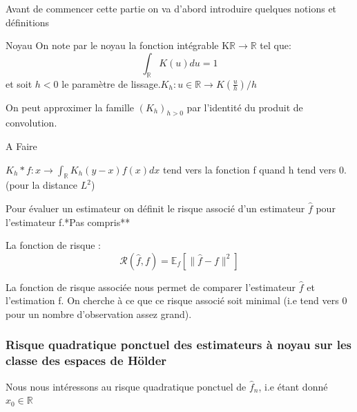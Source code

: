 \documentclass[
]{article}
\begin{document}
Avant de commencer cette partie on va d'abord introduire quelques
notions et définitions\newline

\begin{definition} {Noyau}  
On note par le noyau la fonction intégrable K$\mathbb{R}\rightarrow\mathbb{R}$ tel que:
$$\int_{\mathbb{R}}K(u)du =1$$
et soit $h<0$ le paramètre de lissage.\newline $K_h : u\in \mathbb{R} \rightarrow K(\frac{u}{h})/h$

\end{definition}

\begin{lemma}
On peut approximer la famille $(K_h)_{h>0}$ par l'identité du produit de convolution.
\end{lemma}

\begin{demonstration}
A Faire
\end{demonstration}

\begin{corollary}
$K_h * f : x \rightarrow \int_{\mathbb R} K_h(y-x) f(x) dx$ tend vers la fonction f quand h tend vers 0.(pour la distance $L^2$)
\end{corollary}

Pour évaluer un estimateur on définit le risque associé d'un estimateur
\(\hat f\) pour l'estimateur f.\newline **Pas compris**

\begin{definition} 
La fonction de risque : 
$$ 
\mathcal R(\hat f ,f)=\mathbb E_f[\parallel\hat f -f\parallel^2]
$$
\end{definition}

\begin{remark}
  La fonction de risque associée nous permet de comparer l'estimateur $\hat f$ et l'estimation f.\newline
On cherche à ce que ce risque associé soit minimal (i.e tend vers 0 pour un nombre d'observation assez grand).\newline
\end{remark}

\subsubsection{Risque quadratique ponctuel des estimateurs à noyau sur les classe des espaces de Hölder}

Nous nous intéressons au risque quadratique ponctuel de \(\hat{f}_n\),
i.e étant donné\newline \(x_0 \in \mathbb{R}\)
\end{document}
